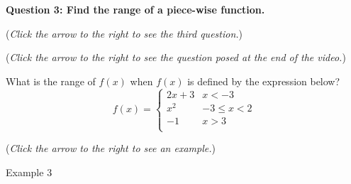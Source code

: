 \documentclass{ximera}
\begin{document}
\textbf{Question 3: Find the range of a piece-wise function.}
\begin{question}
\begin{flushright}
{\color{blue}(\emph{Click the arrow to the right to see the third question.}) }
\end{flushright}
\begin{center}
\begin{expandable}
\begin{flushright}
{\color{blue}(\emph{Click the arrow to the right to see the question
posed at the end of the video.})}
\end{flushright}
\begin{expandable}

What is the range of $f(x)$ when $f(x)$ is defined by the expression below?\\

\[ f(x) = \begin{cases} 
      2x+3 & x<-3 \\
      x^2 & -3\leq x< 2 \\
      -1 & x> 3\\	
   \end{cases} \]
   
\begin{multipleChoice}
\choice{$(\infty, -3] \cup [4,9]$}
\choice{$(\infty, -1] \cup [0,9]$}
\choice{$(\infty, -3) \cup \{-1\} \cup [0,9)$}
\end{multipleChoice}
\begin{flushright}
{\color{blue}(\emph{Click the arrow to the right to see an example.})}
\end{flushright}
\begin{expandable}
\begin{center}
Example 3
\end{center}
\end{expandable}
\end{expandable}
\end{expandable}
\end{center}
\end{question}
\end{document}
